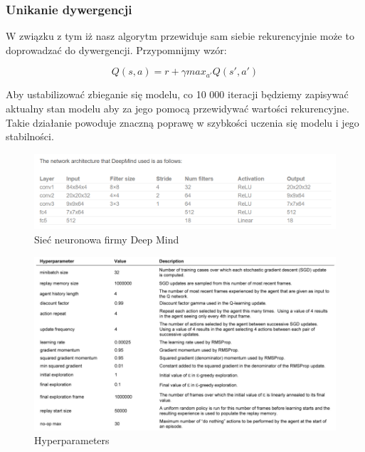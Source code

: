\documentclass[12pt]{article}
\begin{document}
\subsubsection{Unikanie dywergencji}

W związku z tym iż nasz algorytm przewiduje sam siebie rekurencyjnie może to doprowadzać do dywergencji. Przypomnijmy wzór: 

$$Q(s, a) = r + \gamma max_{a'}Q(s',a')$$

Aby ustabilizować zbieganie się modelu, co 10 000 iteracji będziemy zapisywać aktualny stan modelu aby za jego pomocą przewidywać wartości rekurencyjne. Takie działanie powoduje znaczną poprawę w szybkości uczenia się modelu i jego stabilności.

\begin{figure}[H]
\centering \includegraphics[scale=0.7]{deep_mind_architecture.PNG}
\caption{Sieć neuronowa firmy Deep Mind}
\label{simple1}
\end{figure}


\begin{figure}[H]
\centering \includegraphics[scale=0.5]{hyperparameters.PNG}
\caption{Hyperparameters}
\label{simple1}
\end{figure}
\end{document}
